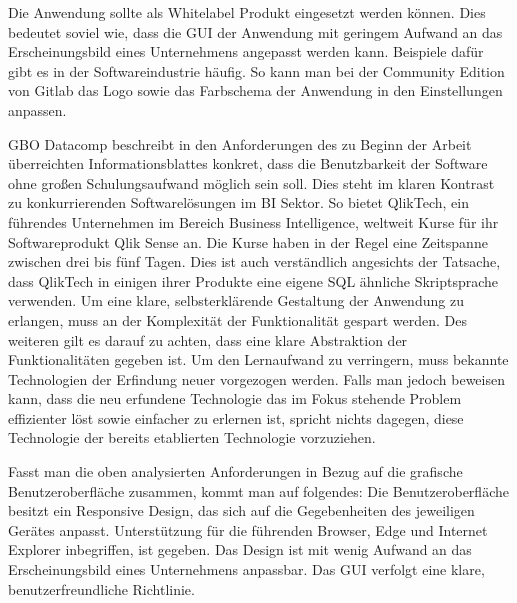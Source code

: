 Die Anwendung sollte als Whitelabel Produkt eingesetzt werden können. Dies bedeutet soviel wie,
dass die GUI der Anwendung mit geringem Aufwand an das Erscheinungsbild eines Unternehmens angepasst
werden kann. Beispiele dafür gibt es in der Softwareindustrie häufig. So kann man bei
der Community Edition von Gitlab das Logo sowie das Farbschema der Anwendung in den Einstellungen
anpassen.\cite{GitlabDocs}

GBO Datacomp beschreibt in den Anforderungen des zu Beginn der Arbeit überreichten
Informationsblattes konkret, dass die Benutzbarkeit der Software ohne großen Schulungsaufwand möglich sein soll.
Dies steht im klaren Kontrast zu konkurrierenden Softwarelösungen im BI Sektor.
So bietet QlikTech, ein führendes Unternehmen im Bereich Business Intelligence,
weltweit Kurse für ihr Softwareprodukt Qlik Sense an. Die Kurse haben in der
Regel eine Zeitspanne zwischen drei bis fünf Tagen.\cite{QlikSenseTraining}
Dies ist auch verständlich angesichts der Tatsache, dass QlikTech in einigen
ihrer Produkte eine eigene SQL ähnliche Skriptsprache verwenden.\cite{QlikSenseScriptLanguage}
Um eine klare, selbsterklärende Gestaltung der Anwendung zu erlangen,
muss an der Komplexität der Funktionalität gespart werden. Des weiteren
gilt es darauf zu achten, dass eine klare Abstraktion der Funktionalitäten
gegeben ist. Um den Lernaufwand zu verringern, muss bekannte Technologien
der Erfindung neuer vorgezogen werden. Falls man jedoch beweisen kann,
dass die neu erfundene Technologie das im Fokus stehende Problem effizienter löst
sowie einfacher zu erlernen ist, spricht nichts dagegen, diese Technologie der bereits
etablierten Technologie vorzuziehen.

Fasst man die oben analysierten Anforderungen in Bezug auf die grafische Benutzeroberfläche
zusammen, kommt man auf folgendes: Die Benutzeroberfläche besitzt ein Responsive Design,
das sich auf die Gegebenheiten des jeweiligen Gerätes anpasst. Unterstützung
für die führenden Browser, Edge und Internet Explorer inbegriffen, ist gegeben.
Das Design ist mit wenig Aufwand an das Erscheinungsbild eines Unternehmens anpassbar.
Das GUI verfolgt eine klare, benutzerfreundliche Richtlinie.

